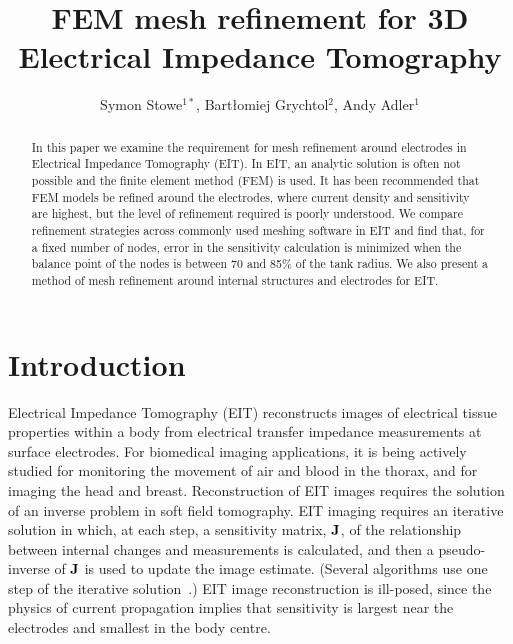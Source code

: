 \documentclass[12pt]{iopart}
\newcommand{\COMMENT}[1]{ \textsf{\color{blue}{{COMMENT: #1}}} }
\begin{document}
\title{%
FEM mesh refinement for 3D Electrical Impedance Tomography %
}

 \author{%
Symon Stowe$^{1*}$,
Bart\l{}omiej Grychtol$^2$,
Andy Adler$^1$}

\address{
$^1$~Systems and Computer Engineering, Carleton University, Ottawa, Canada
$^2$~\COMMENT{TODO: Fill this in}
}
\vspace{10pt}

\begin{abstract}
In this paper we examine the requirement for mesh refinement around 
electrodes in Electrical Impedance Tomography (EIT). In EIT, an analytic solution is
often not possible and the finite
element method (FEM) is used. 
It has been recommended that FEM models be refined around the electrodes, where current
density and sensitivity are highest, but the level of refinement required is poorly understood.
We compare refinement strategies across commonly used meshing software in EIT and
find that, for a fixed number of nodes, error in the sensitivity calculation is minimized 
when the balance point of the nodes is between 70 and 85\% of the tank radius. We also present 
a method of mesh refinement around internal structures and electrodes for EIT.
\end{abstract}

\section{Introduction}
Electrical Impedance Tomography (EIT) reconstructs images of 
electrical tissue properties within a body from electrical
transfer impedance measurements at surface electrodes. For
biomedical imaging applications, it is being actively studied
for monitoring
the movement of air and blood in the thorax, and for imaging
the head and breast. Reconstruction of EIT images requires
the solution of an inverse problem in soft field tomography.
EIT imaging requires an iterative solution in which, at each step,
a sensitivity matrix, $\bf J$, of
the relationship between internal changes and measurements
is calculated, and then a pseudo-inverse of $\bf J$ is used
to update the image estimate. (Several algorithms use
one step of the iterative solution~\parencite{lionheart_eit_2004}.)
EIT image reconstruction is ill-posed, since the physics of
current propagation implies that sensitivity is largest near
the electrodes and smallest in the body centre.
\end{document}
